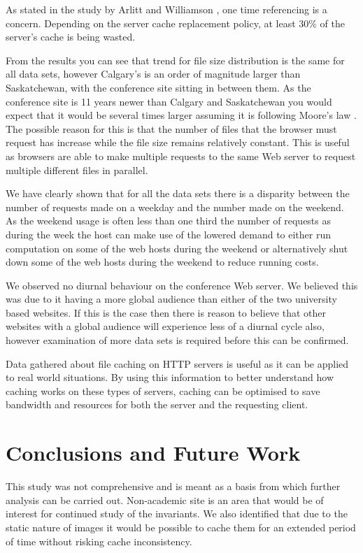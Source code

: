 \documentclass[10pt,conference]{IEEEtran}
\begin{document}
As stated in the study by Arlitt and Williamson \cite{invariants}, one time referencing is a concern. Depending on the server cache replacement policy, at least 30\% of the server's cache is being wasted. 

From the results you can see that trend for file size distribution is the same for all data sets, however Calgary's is an order of magnitude larger than Saskatchewan, with the conference site sitting in between them. As the conference site is 11 years newer than Calgary and Saskatchewan you would expect that it would be several times larger assuming it is following Moore's law \cite{williams05}. The possible reason for this is that the number of files that the browser must request has increase while the file size remains relatively constant. This is useful as browsers are able to make multiple requests to the same Web server to request multiple different files in parallel.

We have clearly shown that for all the data sets there is a disparity between the number of requests made on a weekday and the number made on the weekend. As the weekend usage is often less than one third the number of requests as during the week the host can make use of the lowered demand to either run computation on some of the web hosts during the weekend or alternatively shut down some of the web hosts during the weekend to reduce running costs.

We observed no diurnal behaviour on the conference Web server. We believed this was due to it having a more global audience than either of the two university based websites. If this is the case then there is reason to believe that other websites with a global audience will experience less of a diurnal cycle also, however examination of more data sets is required before this can be confirmed.

Data gathered about file caching on HTTP servers is useful as it can be applied to real world situations. By using this information to better understand how caching works on these types of servers, caching can be optimised to save bandwidth and resources for both the server and the requesting client.

\section{Conclusions and Future Work}\label{conclusions}
This study was not comprehensive and is meant as a basis from which further analysis can be carried out. Non-academic site is an area that would be of interest for continued study of the invariants.
We also identified that due to the static nature of images it would be possible to cache them for an extended period of time without risking cache inconsistency.

\printbibliography
\end{document}
